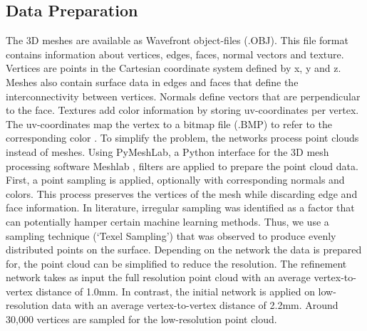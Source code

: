 \documentclass[class=article, crop=false]{standalone}
\begin{document}
\subsection{Data Preparation}\label{sec_data_preparation}
The 3D meshes are available as Wavefront object-files (.OBJ). This file format contains information about vertices, edges, faces, normal vectors and texture.
Vertices are points in the Cartesian coordinate system defined by x, y and z. Meshes also contain surface data in edges and faces that define the interconnectivity between vertices. Normals define vectors that are perpendicular to the face. Textures add color information by storing uv-coordinates per vertex. The uv-coordinates map the vertex to a bitmap file (.BMP) to refer to the corresponding color  \cite{Jong}.
To simplify the problem, the networks process point clouds instead of meshes. Using PyMeshLab, a Python interface for the 3D mesh processing software Meshlab \cite{meshlab}, filters are applied to prepare the point cloud data. First, a point sampling is applied, optionally with corresponding normals and colors. This process preserves the vertices of the mesh while discarding edge and face information. In literature, irregular sampling was identified as a factor that can potentially hamper certain machine learning methods. Thus, we use a sampling technique (‘Texel Sampling’) that was observed to produce evenly distributed points on the surface. Depending on the network the data is prepared for, the point cloud can be simplified to reduce the resolution. The refinement network takes as input the full resolution point cloud with an average vertex-to-vertex distance of 1.0mm. In contrast, the initial network is applied on low-resolution data with an average vertex-to-vertex distance of 2.2mm. Around 30,000 vertices are sampled for the low-resolution point cloud.
\end{document}
